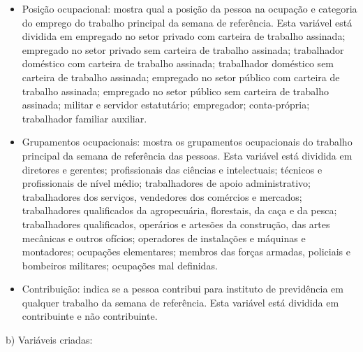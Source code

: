 \documentclass[12pt,a4paper,header]{abnt}
\begin{document}
\begin{itemize}
    \item[\textbf{•}]Posição ocupacional: mostra qual a posição da pessoa na ocupação e categoria do emprego do trabalho principal da semana de referência. Esta variável está dividida em empregado no setor privado com carteira de trabalho assinada; empregado no setor privado sem carteira de trabalho assinada; trabalhador doméstico com carteira de trabalho assinada; trabalhador doméstico sem carteira de trabalho assinada; empregado no setor público com carteira de trabalho assinada; empregado no setor público sem carteira de trabalho assinada; militar e servidor estatutário; empregador; conta-própria; trabalhador familiar auxiliar.
    \item[\textbf{•}]Grupamentos ocupacionais: mostra os grupamentos ocupacionais do trabalho principal da semana de referência das pessoas. Esta variável está dividida em diretores e gerentes; profissionais das ciências e intelectuais; técnicos e profissionais de nível médio; trabalhadores de apoio administrativo; trabalhadores dos serviços, vendedores dos comércios e mercados; trabalhadores qualificados da agropecuária, florestais, da caça e da pesca; trabalhadores qualificados, operários e artesões da construção, das artes mecânicas e outros ofícios; operadores de instalações e máquinas e montadores; ocupações elementares; membros das forças armadas, policiais e bombeiros militares; ocupações mal definidas.
    \item[\textbf{•}]Contribuição: indica se a pessoa contribui para instituto de previdência em qualquer trabalho da semana de referência. Esta variável está dividida em contribuinte e não contribuinte.
\end{itemize}

\vspace{1em}
\noindent b) Variáveis criadas:
\end{document}
